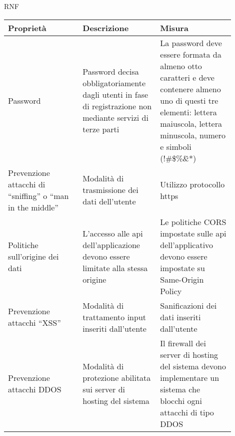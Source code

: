 \begin{listaPersonale}{RNF}
    \begin{tabular}{|p{0.3\linewidth}|p{0.3\linewidth}|p{0.3\linewidth}|}
        \hline
        \rowcolor{viola} \textbf{Proprietà}                                             &
        \textbf{Descrizione}                                                            &
        \textbf{Misura}                                                                   \\
        \hline
        Password                                                                        &
        Password decisa obbligatoriamente dagli utenti in fase di
        registrazione non mediante servizi di terze parti                               &
        La password deve essere formata da almeno otto caratteri e
        deve contenere almeno uno di questi tre elementi:
        lettera maiuscola, lettera minuscola, numero e simboli (!\@\#\$\%\^\&*)           \\
        \hline
        Prevenzione attacchi di “sniffing” o “man in the middle”                        &
        Modalità di trasmissione dei dati dell'utente                                   &
        Utilizzo protocollo https                                                         \\
        \hline
        Politiche sull'origine dei dati                                                 &
        L'accesso alle api dell'applicazione devono essere limitate alla stessa origine &
        Le politiche CORS impostate sulle api dell'applicativo
        devono essere impostate su Same-Origin Policy                                     \\
        \hline
        Prevenzione attacchi “XSS”                                                      &
        Modalità di trattamento input inseriti dall'utente                              &
        Sanificazioni dei dati inseriti dall'utente                                       \\
        \hline
        Prevenzione attacchi DDOS                                                       &
        Modalità di protezione abilitata sui server di hosting del sistema              &
        Il firewall dei server di hosting del sistema devono implementare
        un sistema che blocchi ogni attacchi di tipo DDOS                                 \\
        \hline
    \end{tabular}


\end{listaPersonale}
